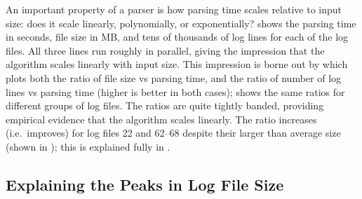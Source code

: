 An important property of a parser is how parsing time scales relative to
input size: does it scale linearly, polynomially, or exponentially?
 shows the
parsing time in seconds, file size in MB, and tens of thousands of log
lines for each of the \numberOFlogFILES{} log files.  All three lines run
roughly in parallel, giving the impression that the algorithm scales
linearly with input size.  This impression is borne out by
 which
plots both the ratio of file size vs parsing time, and the ratio of number
of log lines vs parsing time (higher is better in both cases);
shows the same ratios for different groups of log files.  The ratios are
quite tightly banded, providing empirical evidence that the algorithm
scales linearly.  The ratio increases (i.e.\ improves) for log files 22 and
62--68 despite their larger than average size (shown in ); this is explained fully
in .




\subsection{Explaining the Peaks in Log File Size}

\label{Explaining the peaks in log file size}

